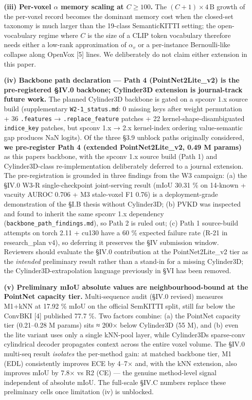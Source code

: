\documentclass[
]{article}
\begin{document}
\textbf{(iii) Per-voxel \(\alpha\) memory scaling at \(C \ge 100\).} The
\((C+1) \times 4\,\text{B}\) growth of the per-voxel record becomes the
dominant memory cost when the closed-set taxonomy is much larger than
the 19-class SemanticKITTI setting; the open-vocabulary regime where
\(C\) is the size of a CLIP token vocabulary therefore needs either a
low-rank approximation of \(\alpha_v\) or a per-instance Bernoulli-like
collapse along OpenVox {[}5{]} lines. We deliberately do not claim
either extension in this paper.

\textbf{(iv) Backbone path declaration --- Path 4 (PointNet2Lite\_v2) is
the pre-registered §IV.0 backbone; Cylinder3D extension is journal-track
future work.} The planned Cylinder3D backbone is gated on a spconv 1.x
source build (supplementary \texttt{W2-1\_status.md}: 0 missing keys
after weight permutation + 36 \texttt{.features} →
\texttt{.replace\_feature} patches + 22 kernel-shape-disambiguated
\texttt{indice\_key} patches, but spconv 1.x → 2.x kernel-index ordering
value-semantic gap produces NaN logits). Of the three §3.9 unblock paths
originally considered, \textbf{we pre-register Path 4 (extended
PointNet2Lite\_v2, 0.49 M params)} as this paper\textquotesingle s
backbone, with the spconv 1.x source build (Path 1) and Cylinder3D-class
re-implementation deliberately deferred to a journal extension. The
pre-registration is grounded in three findings from the W3 campaign: (a)
the §IV.0 W3-R single-checkpoint joint-serving result (mIoU 30.31 \% on
14-known + vacuity AUROC 0.706 + M3 stale-voxel F1 0.76) is a
deployment-grade demonstration of the §I.B thesis without Cylinder3D;
(b) PVKD was inspected and found to inherit the same spconv 1.x
dependency (\texttt{backbone\_path\_findings.md}), so Path 2 is ruled
out; (c) Path 1 source-build attempts on torch 2.11 + cu130 have a 60 \%
expected failure rate (R-21 in research\_plan v4), so deferring it
preserves the §IV submission window. Reviewers should evaluate the §IV.0
contribution at the PointNet2Lite\_v2 tier as the \emph{intended}
preliminary result rather than a stand-in for a missing Cylinder3D; the
Cylinder3D-extrapolation language previously in §VI has been removed.

\textbf{(v) Preliminary mIoU absolute values are neighbourhood-bound at
the PointNet capacity tier.} Multi-sequence audit (§IV.0 revised)
measures M1+kNN at 17.92 \% mIoU on the official SemKITTI split, still
far below the ConvBKI {[}4{]} published 77.7 \%. Two factors combine:
(a) the PointNet capacity tier (0.21--0.28 M params) sits ≈ 200× below
Cylinder3D (55 M), and (b) even the lite variant uses only a single
kNN-pool layer, while Cylinder3D\textquotesingle s sparse-conv
cylindrical decoder propagates context across the entire voxel volume.
The §IV.0 multi-seq result \emph{isolates} the per-method gain: at
matched backbone tier, M1 (EDL) consistently improves ECE by 4--7× and,
with the kNN extension, also improves mIoU by 7.8× vs R2 (CE) --- the
genuine method-level signal independent of absolute mIoU. The full-scale
§IV.C numbers replace these preliminary cells once limitation (iv) is
unblocked.
\end{document}
